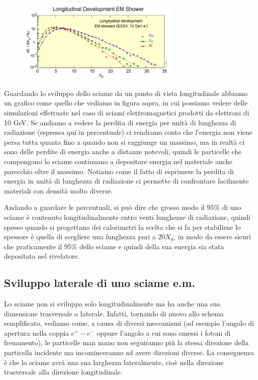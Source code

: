 \begin{figure}[H]
    \centering
    \includegraphics[width=0.7\textwidth]{immagini/grafico_longitudinale.png}
\end{figure}

Guardando lo sviluppo dello sciame da un punto di vista longitudinale abbiamo un grafico come quello che vediamo in figura sopra, in cui possiamo vedere delle simulazioni effettuate nel caso di sciami elettromagnetici prodotti da elettroni di 10 GeV. Se andiamo a vedere la perdita di energia per unità di lunghezza di radiazione (espressa qui in percentuale) ci rendiamo conto che l'energia non viene persa tutta quanta fino a quando non si raggiunge un massimo, ma in realtà ci sono delle perdite di energia anche a distanze notevoli, quindi le particelle che compongono lo sciame continuano a depositare energia nel materiale anche parecchio oltre il massimo. Notiamo come il fatto di esprimere la perdita di energia in unità di lunghezza di radiazione ci permette di confrontare facilmente materiali con densità molto diverse.

Andando a guardare le percentuali, si può dire che grosso modo il 95\% di uno sciame è contenuto longitudinalmente entro venti lunghezze di radiazione, quindi spesso quando si progettano dei calorimetri la scelta che si fa per stabilirne lo spessore è quella di scegliere una lunghezza pari a $20X_0$, in modo da essere sicuri che praticamente il 95\% dello sciame e quindi della sua energia sia stata depositata nel rivelatore.

\subsection{Sviluppo laterale di uno sciame e.m.}
Lo sciame non si sviluppa solo longitudinalmente ma ha anche una sua dimensione trasversale o laterale. Infatti, tornando di nuovo allo schema semplificato, vediamo come, a causa di diversi meccanismi (ad esempio l'angolo di apertura nella coppia $e^+ - e^-$ oppure l'angolo a cui sono emessi i fotoni di frenamento), le particelle man mano non seguiranno più la stessa direzione della particella incidente ma incominceranno ad avere direzioni diverse. La conseguenza è che lo sciame avrà una sua larghezza lateralmente, cioè nella direzione trasversale alla direzione longitudinale.

